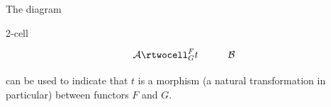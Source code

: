 \begin{frame}
The diagram
\begin{block}{2-cell}
	$$
	\xymatrix{
	\mathcal{A}
	\rtwocell^F_G{t}
	&
	\mathcal{B}
	}
	$$
\end{block}
can be used to indicate that $t$ is a morphism (a natural transformation in particular) between functors $F$ and $G$.
\end{frame}
